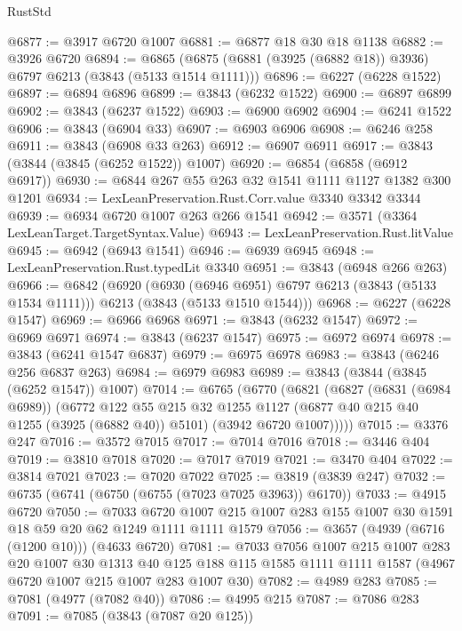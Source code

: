 \begin{lexlean}{RustStd}
\begin{coremodule}
@6877 := @3917 @6720 @1007
@6881 := @6877 @18 @30 @18 @1138
@6882 := @3926 @6720
@6894 := @6865 (@6875 (@6881 (@3925 (@6882 @18)) @3936) @6797 @6213 (@3843 (@5133 @1514 @1111)))
@6896 := @6227 (@6228 @1522)
@6897 := @6894 @6896
@6899 := @3843 (@6232 @1522)
@6900 := @6897 @6899
@6902 := @3843 (@6237 @1522)
@6903 := @6900 @6902
@6904 := @6241 @1522
@6906 := @3843 (@6904 @33)
@6907 := @6903 @6906
@6908 := @6246 @258
@6911 := @3843 (@6908 @33 @263)
@6912 := @6907 @6911
@6917 := @3843 (@3844 (@3845 (@6252 @1522)) @1007)
@6920 := @6854 (@6858 (@6912 @6917))
@6930 := @6844 @267 @55 @263 @32 @1541 @1111 @1127 @1382 @300 @1201
@6934 := LexLeanPreservation.Rust.Corr.value @3340 @3342 @3344
@6939 := @6934 @6720 @1007 @263 @266 @1541
@6942 := @3571 (@3364 LexLeanTarget.TargetSyntax.Value)
@6943 := LexLeanPreservation.Rust.litValue
@6945 := @6942 (@6943 @1541)
@6946 := @6939 @6945
@6948 := LexLeanPreservation.Rust.typedLit @3340
@6951 := @3843 (@6948 @266 @263)
@6966 := @6842
    (@6920
      (@6930 (@6946 @6951) @6797 @6213 (@3843 (@5133 @1534 @1111)))
      @6213
      (@3843 (@5133 @1510 @1544)))
@6968 := @6227 (@6228 @1547)
@6969 := @6966 @6968
@6971 := @3843 (@6232 @1547)
@6972 := @6969 @6971
@6974 := @3843 (@6237 @1547)
@6975 := @6972 @6974
@6978 := @3843 (@6241 @1547 @6837)
@6979 := @6975 @6978
@6983 := @3843 (@6246 @256 @6837 @263)
@6984 := @6979 @6983
@6989 := @3843 (@3844 (@3845 (@6252 @1547)) @1007)
@7014 := @6765
    (@6770
      (@6821
        (@6827
          (@6831 (@6984 @6989))
          (@6772
            @122
            @55
            @215
            @32
            @1255
            @1127
            (@6877 @40 @215 @40 @1255 (@3925 (@6882 @40)) @5101)
            (@3942 @6720 @1007)))))
@7015 := @3376 @247
@7016 := @3572 @7015
@7017 := @7014 @7016
@7018 := @3446 @404
@7019 := @3810 @7018
@7020 := @7017 @7019
@7021 := @3470 @404
@7022 := @3814 @7021
@7023 := @7020 @7022
@7025 := @3819 (@3839 @247)
@7032 := @6735 (@6741 (@6750 (@6755 (@7023 @7025 @3963)) @6170))
@7033 := @4915 @6720
@7050 := @7033
    @6720
    @1007
    @215
    @1007
    @283
    @155
    @1007
    @30
    @1591
    @18
    @59
    @20
    @62
    @1249
    @1111
    @1111
    @1579
@7056 := @3657 (@4939 (@6716 (@1200 @10))) (@4633 @6720)
@7081 := @7033
    @7056
    @1007
    @215
    @1007
    @283
    @20
    @1007
    @30
    @1313
    @40
    @125
    @188
    @115
    @1585
    @1111
    @1111
    @1587
    (@4967 @6720 @1007 @215 @1007 @283 @1007 @30)
@7082 := @4989 @283
@7085 := @7081 (@4977 (@7082 @40))
@7086 := @4995 @215
@7087 := @7086 @283
@7091 := @7085 (@3843 (@7087 @20 @125))

\end{coremodule}
\end{lexlean}
